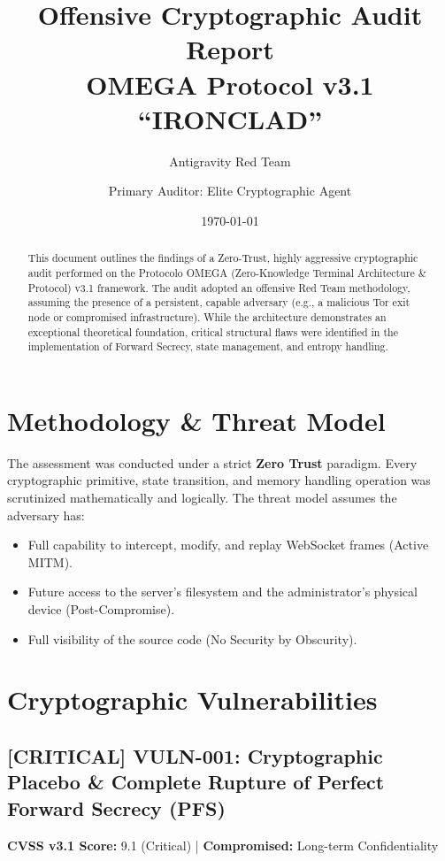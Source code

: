 \documentclass[11pt,a4paper]{article}
\title{\textbf{Offensive Cryptographic Audit Report}\\ \Large OMEGA Protocol v3.1 ``IRONCLAD''}
\author{Antigravity Red Team \and Primary Auditor: Elite Cryptographic Agent}
\date{\today}
\begin{document}
\maketitle

\begin{abstract}
This document outlines the findings of a Zero-Trust, highly aggressive cryptographic audit performed on the Protocolo OMEGA (Zero-Knowledge Terminal Architecture \& Protocol) v3.1 framework. The audit adopted an offensive Red Team methodology, assuming the presence of a persistent, capable adversary (e.g., a malicious Tor exit node or compromised infrastructure). While the architecture demonstrates an exceptional theoretical foundation, critical structural flaws were identified in the implementation of Forward Secrecy, state management, and entropy handling.
\end{abstract}

\section{Methodology \& Threat Model}
The assessment was conducted under a strict \textbf{Zero Trust} paradigm. Every cryptographic primitive, state transition, and memory handling operation was scrutinized mathematically and logically. The threat model assumes the adversary has:
\begin{itemize}
    \item Full capability to intercept, modify, and replay WebSocket frames (Active MITM).
    \item Future access to the server's filesystem and the administrator's physical device (Post-Compromise).
    \item Full visibility of the source code (No Security by Obscurity).
\end{itemize}

\section{Cryptographic Vulnerabilities}

\subsection*{\textcolor{critical}{[CRITICAL]} VULN-001: Cryptographic Placebo \& Complete Rupture of Perfect Forward Secrecy (PFS)}
\textbf{CVSS v3.1 Score:} 9.1 (Critical) | \textbf{Compromised:} Long-term Confidentiality
\vspace{0.5cm}
\end{document}
